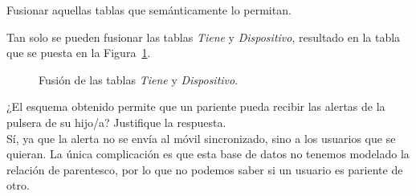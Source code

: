 \documentclass[12pt]{article}
\begin{document}
\begin{ejercicio}[$1$ punto] Fusionar aquellas tablas que semánticamente lo permitan.

    Tan solo se pueden fusionar las tablas \emph{Tiene} y \emph{Dispositivo}, resultado en la tabla que se puesta en la Figura~\ref{fig:fusion}.
    \begin{figure}
        \centering
        \caption{Fusión de las tablas \emph{Tiene} y \emph{Dispositivo}.}
        \label{fig:fusion}
    \end{figure}
\end{ejercicio}

\begin{ejercicio}[$0.5$ puntos] ¿El esquema obtenido permite que un pariente pueda recibir las alertas de la pulsera de su hijo/a? Justifique la respuesta.\\

    Sí, ya que la alerta no se envía al móvil sincronizado, sino a los usuarios que se quieran.
    La única complicación es que esta base de datos no tenemos modelado la relación de parentesco, por lo que no podemos saber si un usuario es pariente de otro.
\end{ejercicio}
\end{document}
